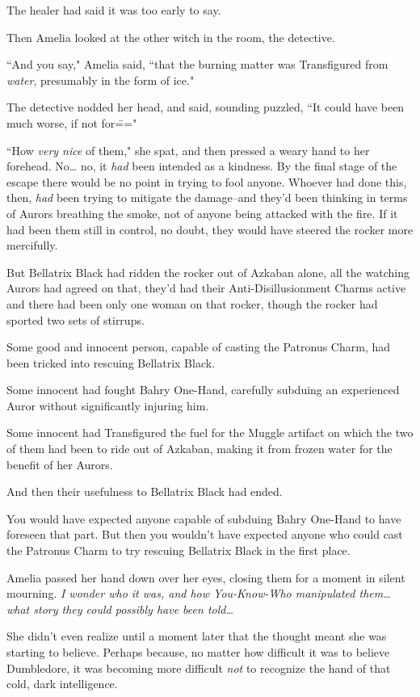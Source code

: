 The healer had said it was too early to say.

Then Amelia looked at the other witch in the room, the detective.

``And you say," Amelia said, ``that the burning matter was Transfigured from \emph{water}, presumably in the form of ice."

The detective nodded her head, and said, sounding puzzled, ``It could have been much worse, if not for\==="

``How \emph{very nice} of them," she spat, and then pressed a weary hand to her forehead. No{\ldots} no, it \emph{had} been intended as a kindness. By the final stage of the escape there would be no point in trying to fool anyone. Whoever had done this, then, \emph{had} been trying to mitigate the damage\---and they'd been thinking in terms of Aurors breathing the smoke, not of anyone being attacked with the fire. If it had been them still in control, no doubt, they would have steered the rocker more mercifully.

But Bellatrix Black had ridden the rocker out of Azkaban alone, all the watching Aurors had agreed on that, they'd had their Anti-Disillusionment Charms active and there had been only one woman on that rocker, though the rocker had sported two sets of stirrups.

Some good and innocent person, capable of casting the Patronus Charm, had been tricked into rescuing Bellatrix Black.

Some innocent had fought Bahry One-Hand, carefully subduing an experienced Auror without significantly injuring him.

Some innocent had Transfigured the fuel for the Muggle artifact on which the two of them had been to ride out of Azkaban, making it from frozen water for the benefit of her Aurors.

And then their usefulness to Bellatrix Black had ended.

You would have expected anyone capable of subduing Bahry One-Hand to have foreseen that part. But then you wouldn't have expected anyone who could cast the Patronus Charm to try rescuing Bellatrix Black in the first place.

Amelia passed her hand down over her eyes, closing them for a moment in silent mourning. \emph{I wonder who it was, and how You-Know-Who manipulated them{\ldots} what story they could \emph{possibly} have been told{\ldots}}

She didn't even realize until a moment later that the thought meant she was starting to believe. Perhaps because, no matter how difficult it was to believe Dumbledore, it was becoming more difficult \emph{not} to recognize the hand of that cold, dark intelligence.

